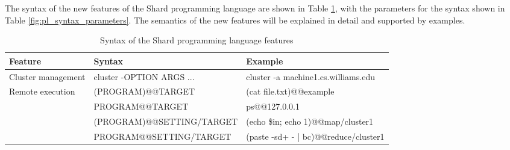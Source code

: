 \documentclass[twoside]{report}
\begin{document}
The syntax of the new features of the Shard programming language are shown in Table \ref{fig:pl_syntax}, with the parameters for the syntax shown in Table \ref{fig:pl_syntax_parameters}.
The semantics of the new features will be explained in detail and supported by examples.

\begin{table}
  \begin{center}
    \begin{tabular}{|l|l|l|}
      \hline
      Feature                           & Syntax                    & Example                              \\ \hline
      Cluster management                & cluster -OPTION ARGS ...  & cluster -a machine1.cs.williams.edu  \\ \hline
      \multirow{4}{*}{Remote execution} & (PROGRAM)@@TARGET         & (cat file.txt)@@example              \\ \cline{2-3}
                                        & PROGRAM@@TARGET           & ps@@127.0.0.1                        \\ \cline{2-3}
                                        & (PROGRAM)@@SETTING/TARGET & (echo \$in; echo 1)@@map/cluster1    \\ \cline{2-3}
                                        & PROGRAM@@SETTING/TARGET   & (paste -sd+ - | bc)@@reduce/cluster1 \\ \hline
    \end{tabular}
    \caption{Syntax of the Shard programming language features}
    \label{fig:pl_syntax}
  \end{center}
\end{table}
\end{document}
